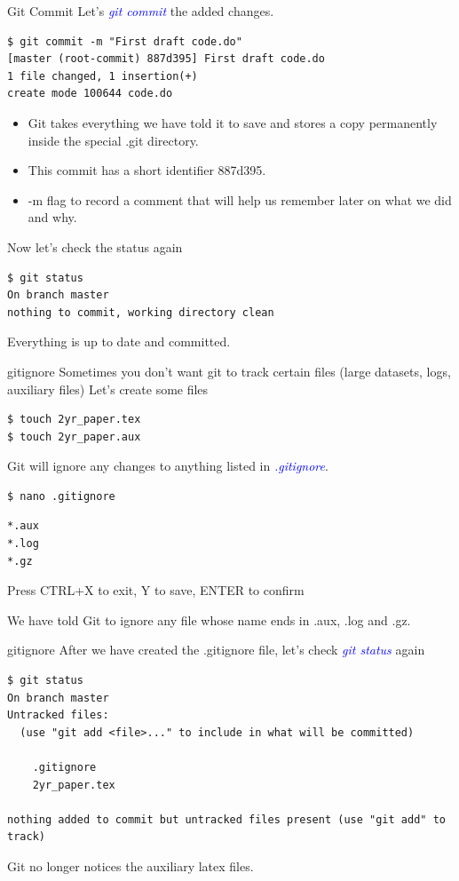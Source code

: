 \documentclass[11pt]{beamer}
\begin{document}
\begin{frame}[fragile]{Git Commit}
Let's \textcolor{blue}{\emph{git commit}} the added changes. 
\begin{lstlisting}
$ git commit -m "First draft code.do"
[master (root-commit) 887d395] First draft code.do
1 file changed, 1 insertion(+)
create mode 100644 code.do
\end{lstlisting}
\begin{itemize}
\item
Git takes everything we have told it to save and stores a copy permanently inside the special .git directory.
\item
This commit has a short identifier 887d395.
\item
 -m flag to record a comment that will help us remember later on what we did and why.
\end{itemize}
Now let's check the status again
\begin{lstlisting}
$ git status
On branch master
nothing to commit, working directory clean
\end{lstlisting}
Everything is up to date and committed.
\end{frame}


\begin{frame}[fragile]{gitignore}
Sometimes you don't want git to track certain files (large datasets, logs, auxiliary files)
Let's create some files
\begin{lstlisting}
$ touch 2yr_paper.tex
$ touch 2yr_paper.aux
\end{lstlisting}

Git will ignore any changes to anything listed in \textcolor{blue}{\emph{.gitignore}}.
\begin{lstlisting}
$ nano .gitignore
\end{lstlisting}
\begin{lstlisting}
*.aux
*.log
*.gz
\end{lstlisting}
\tiny Press CTRL+X to exit, Y to save, ENTER to confirm

\normalsize 
We have told Git to ignore any file whose name ends in .aux, .log and .gz. 
\end{frame}

\begin{frame}[fragile]{gitignore}
After we have created the .gitignore file, let's check \textcolor{blue}{\emph{git status}} again
\begin{lstlisting}
$ git status
On branch master
Untracked files:
  (use "git add <file>..." to include in what will be committed)

	.gitignore
	2yr_paper.tex

nothing added to commit but untracked files present (use "git add" to track)
\end{lstlisting}
Git no longer notices the auxiliary latex files.

\end{frame}
\end{document}
